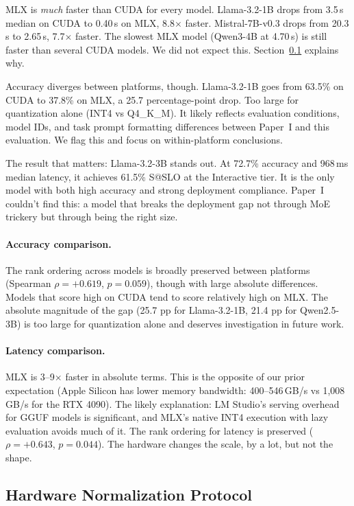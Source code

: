 \documentclass[11pt]{article}
\begin{document}
MLX is \emph{much} faster than CUDA for every model.  Llama-3.2-1B drops from 3.5\,s median on CUDA to 0.40\,s on MLX, 8.8$\times$ faster.  Mistral-7B-v0.3 drops from 20.3\,s to 2.65\,s, 7.7$\times$ faster.  The slowest MLX model (Qwen3-4B at 4.70\,s) is still faster than several CUDA models.  We did not expect this.  Section~\ref{sec:normalization} explains why.

Accuracy diverges between platforms, though.  Llama-3.2-1B goes from 63.5\% on CUDA to 37.8\% on MLX, a 25.7 percentage-point drop.  Too large for quantization alone (INT4 vs Q4\_K\_M).  It likely reflects evaluation conditions, model IDs, and task prompt formatting differences between Paper~I and this evaluation.  We flag this and focus on within-platform conclusions.

The result that matters: Llama-3.2-3B stands out.  At 72.7\% accuracy and 968\,ms median latency, it achieves 61.5\% S@SLO at the Interactive tier.  It is the only model with both high accuracy and strong deployment compliance.  Paper~I couldn't find this: a model that breaks the deployment gap not through MoE trickery but through being the right size.

\paragraph{Accuracy comparison.}
The rank ordering across models is broadly preserved between platforms (Spearman $\rho = +0.619$, $p = 0.059$), though with large absolute differences.  Models that score high on CUDA tend to score relatively high on MLX.  The absolute magnitude of the gap (25.7 pp for Llama-3.2-1B, 21.4 pp for Qwen2.5-3B) is too large for quantization alone and deserves investigation in future work.

\paragraph{Latency comparison.}
MLX is 3--9$\times$ faster in absolute terms.  This is the opposite of our prior expectation (Apple Silicon has lower memory bandwidth: 400--546\,GB/s vs 1,008\,GB/s for the RTX 4090).  The likely explanation: LM Studio's serving overhead for GGUF models is significant, and MLX's native INT4 execution with lazy evaluation avoids much of it.  The rank ordering for latency is preserved ($\rho = +0.643$, $p = 0.044$).  The hardware changes the scale, by a lot, but not the shape.

\subsection{Hardware Normalization Protocol}
\label{sec:normalization}
\end{document}
